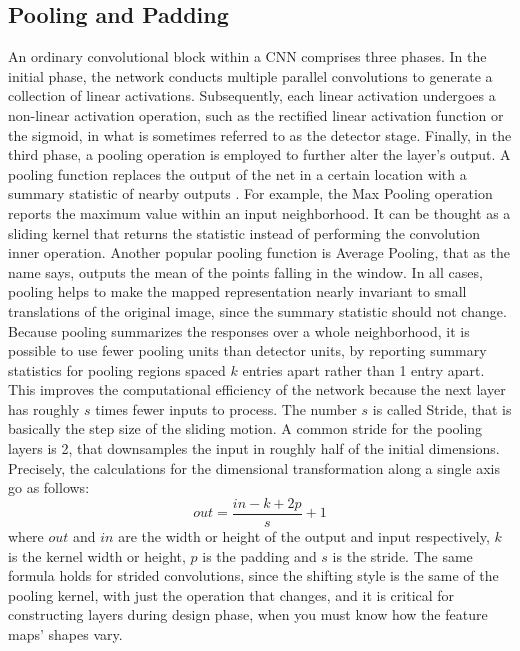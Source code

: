 \documentclass[binding=0.7cm, oneside]{sapthesis}
\begin{document}
\subsection{Pooling and Padding}
An ordinary convolutional block within a CNN comprises three phases. In the initial phase, the network conducts multiple parallel convolutions to generate a collection of linear activations.
Subsequently, each linear activation undergoes a non-linear activation operation, such as the rectified linear activation function or the sigmoid, in what is sometimes referred to as the detector stage.
Finally, in the third phase, a pooling operation is employed to further alter the layer's output.
A pooling function replaces the output of the net in a certain location with a summary statistic of nearby outputs \cite{pooling}. For example, the Max Pooling operation reports the maximum value within an input neighborhood.
It can be thought as a sliding kernel that returns the statistic instead of performing the convolution inner operation. Another popular pooling function is Average Pooling, that as the name says,
outputs the mean of the points falling in the window. In all cases, pooling helps to make the mapped representation nearly invariant to small translations of the original image, since the summary statistic should not change.
Because pooling summarizes the responses over a whole neighborhood, it is possible to use fewer pooling units than detector units, by reporting summary statistics for pooling regions spaced $k$ entries apart rather than 1 entry apart.
This improves the computational efficiency of the network because the next layer has roughly $s$ times fewer inputs to process. The number $s$ is called Stride, that is basically the step size of the sliding motion.
A common stride for the pooling layers is 2, that downsamples the input in roughly half of the initial dimensions. Precisely, the calculations for the dimensional transformation along a single axis go as follows:
$$out = \frac{in - k + 2p}{s} + 1$$
where $out$ and $in$ are the width or height of the output and input respectively, $k$ is the kernel width or height, $p$ is the padding and $s$ is the stride. The same formula holds for strided convolutions, since the shifting style is the same
of the pooling kernel, with just the operation that changes, and it is critical for constructing layers during design phase, when you must know how the feature maps' shapes vary.
\end{document}

